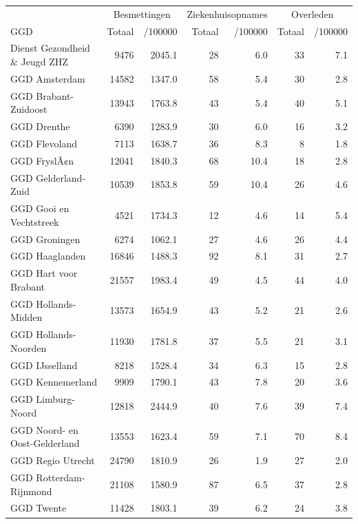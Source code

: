 \documentclass[
  english,
  man,floatsintext]{apa6}
\begin{document}
\begin{table}
\centering\begingroup\fontsize{10}{12}\selectfont

\begin{threeparttable}
\begin{tabular}{lrrrrrr}
\toprule
\multicolumn{1}{c}{ } & \multicolumn{2}{c}{Besmettingen} & \multicolumn{2}{c}{Ziekenhuisopnames} & \multicolumn{2}{c}{Overleden} \\
\cmidrule(l{3pt}r{3pt}){2-3} \cmidrule(l{3pt}r{3pt}){4-5} \cmidrule(l{3pt}r{3pt}){6-7}
GGD & Totaal & /100000 & Totaal & /100000 & Totaal & /100000\\
\midrule
Dienst Gezondheid \& Jeugd ZHZ & 9476 & 2045.1 & 28 & 6.0 & 33 & 7.1\\
GGD Amsterdam & 14582 & 1347.0 & 58 & 5.4 & 30 & 2.8\\
GGD Brabant-Zuidoost & 13943 & 1763.8 & 43 & 5.4 & 40 & 5.1\\
GGD Drenthe & 6390 & 1283.9 & 30 & 6.0 & 16 & 3.2\\
GGD Flevoland & 7113 & 1638.7 & 36 & 8.3 & 8 & 1.8\\
GGD FryslÃ¢n & 12041 & 1840.3 & 68 & 10.4 & 18 & 2.8\\
GGD Gelderland-Zuid & 10539 & 1853.8 & 59 & 10.4 & 26 & 4.6\\
GGD Gooi en Vechtstreek & 4521 & 1734.3 & 12 & 4.6 & 14 & 5.4\\
GGD Groningen & 6274 & 1062.1 & 27 & 4.6 & 26 & 4.4\\
GGD Haaglanden & 16846 & 1488.3 & 92 & 8.1 & 31 & 2.7\\
GGD Hart voor Brabant & 21557 & 1983.4 & 49 & 4.5 & 44 & 4.0\\
GGD Hollands-Midden & 13573 & 1654.9 & 43 & 5.2 & 21 & 2.6\\
GGD Hollands-Noorden & 11930 & 1781.8 & 37 & 5.5 & 21 & 3.1\\
GGD IJsselland & 8218 & 1528.4 & 34 & 6.3 & 15 & 2.8\\
GGD Kennemerland & 9909 & 1790.1 & 43 & 7.8 & 20 & 3.6\\
GGD Limburg-Noord & 12818 & 2444.9 & 40 & 7.6 & 39 & 7.4\\
GGD Noord- en Oost-Gelderland & 13553 & 1623.4 & 59 & 7.1 & 70 & 8.4\\
GGD Regio Utrecht & 24790 & 1810.9 & 26 & 1.9 & 27 & 2.0\\
GGD Rotterdam-Rijnmond & 21108 & 1580.9 & 87 & 6.5 & 37 & 2.8\\
GGD Twente & 11428 & 1803.1 & 39 & 6.2 & 24 & 3.8\\

\end{tabular}
\end{threeparttable}
\end{table}
\end{document}
